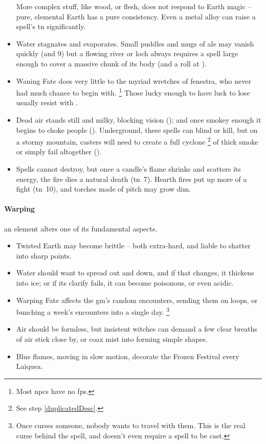 \begin{multicols}{2}
\begin{itemize}
  More complex stuff, like wood, or flesh, does not respond to Earth magic -- pure, elemental Earth has a pure consistency.
  Even a metal alloy can raise a spell's \gls{tn} significantly.
  \item
  Water stagnates and evaporates.
  Small puddles and mugs of ale may vanish quickly (\tn[6] and 9)
  but a flowing river or loch always requires a spell large enough to cover a massive chunk of its body (and a roll at \tn[12]).
  \item
  Waning Fate does very little to the myriad wretches of \gls{fenestra}, who never had much chance to begin with.%
  \footnote{Most \glspl{npc} have no \glspl{fp}.}
  Those lucky enough to have luck to lose usually resist with .
  \item
  Dead air stands still and milky, blocking vision (\tn[7]);
  and once smokey enough it begins to choke people (\tn[9]).
  Underground, these spells can blind or kill, but on a stormy mountain, casters will need to create a full cyclone%
  \footnote{See step \vref{duplicatedDesc}.}
  of thick smoke or simply fail altogether (\tn[16]).
  \item
  Spells cannot destroy, but once a candle's flame shrinks and scatters its energy, the fire dies a natural death (\gls{tn}~7).
  Hearth fires put up more of a fight (\gls{tn}~10), and torches made of pitch may grow dim.
\end{itemize}

\paragraph{Warping}
an element alters one of its fundamental aspects.

\begin{itemize}
  \item
  Twisted Earth may become brittle -- both extra-hard, and liable to shatter into sharp points.
  \item
  Water should want to spread out and down, and if that changes, it thickens into ice;
  or if its clarify fails, it can become poisonous, or even acidic.
  \item
  Warping Fate affects the \gls{gm}'s random encounters, sending them on loops, or bunching a week's encounters into a single day.%
  \footnote{Once  curses someone, nobody wants to travel with them.  This is the real curse behind the spell, and doesn't even require a spell to be cast.}
  \item
  Air should be formless, but insistent witches can demand a few clear breaths of air stick close by, or coax mist into forming simple shapes.
  \item
  Blue flames, moving in slow motion, decorate the Frozen Festival every \gls{Laiquea}.
\end{itemize}


\end{multicols}
